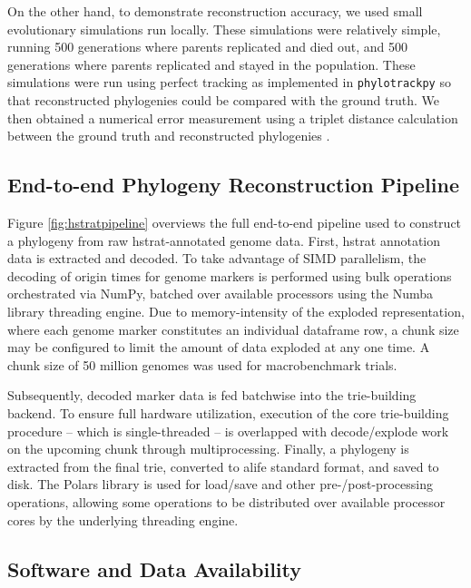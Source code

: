 On the other hand, to demonstrate reconstruction accuracy, we used small evolutionary simulations run locally. 
These simulations were relatively simple, running 500 generations where parents replicated and died out, and 500 generations where parents replicated and stayed in the population. These simulations were run using perfect tracking as implemented in \texttt{phylotrackpy} \citep{dolson2024phylotrack} so that reconstructed phylogenies could be compared with the ground truth.
We then obtained a numerical error measurement using a triplet distance calculation between the ground truth and reconstructed phylogenies \citep{critchlow1996triples}.

\subsection{End-to-end Phylogeny Reconstruction Pipeline}
\label{sec:pipeline}



Figure \ref{fig:hstratpipeline} overviews the full end-to-end pipeline used to construct a phylogeny from raw hstrat-annotated genome data.
First, hstrat annotation data is extracted and decoded.
To take advantage of SIMD parallelism, the decoding of origin times for genome markers is performed using bulk operations orchestrated via NumPy, batched over available processors using the Numba library threading engine.
Due to memory-intensity of the exploded representation, where each genome marker constitutes an individual dataframe row, a chunk size may be configured to limit the amount of data exploded at any one time.
A chunk size of 50 million genomes was used for macrobenchmark trials.

Subsequently, decoded marker data is fed batchwise into the trie-building backend.
To ensure full hardware utilization, execution of the core trie-building procedure -- which is single-threaded -- is overlapped with decode/explode work on the upcoming chunk through multiprocessing.
Finally, a phylogeny is extracted from the final trie, converted to alife standard format, and saved to disk.
The Polars library is used for load/save and other pre-/post-processing operations, allowing some operations to be distributed over available processor cores by the underlying threading engine.

\subsection{Software and Data Availability} \label{sec:materials}

